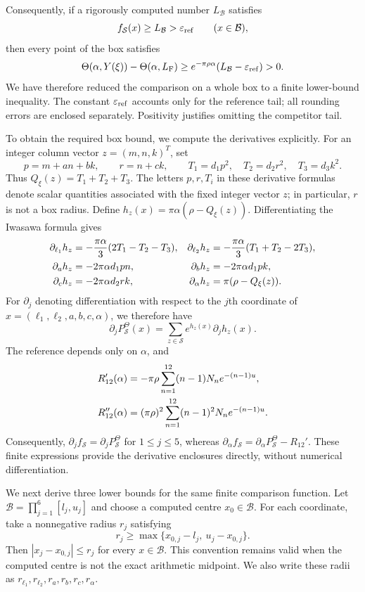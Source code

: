 \documentclass[reqno,english]{amsart}
\theoremstyle{definition}
\newtheorem{open problem}[theorem]{Open Problem}
\theoremstyle{remark}
\theoremstyle{plain}
\numberwithin{equation}{section}
\newcommand{\FCC}{L_{\mathrm F}}
\newcommand{\Th}{\Theta}
\newcommand{\epsref}{\varepsilon_{\rm ref}}
\begin{document}
Consequently, if a rigorously computed number $L_{\mathcal B}$ satisfies
\[
 f_{\mathcal S}(x)\ge L_{\mathcal B}>\epsref
 \qquad(x\in\mathcal B),
\]
then every point of the box satisfies
\[
 \Th(\alpha,Y(\xi))-\Th(\alpha,\FCC)
 \ge e^{-\pi\rho\alpha}(L_{\mathcal B}-\epsref)>0.
\]
We have therefore reduced the comparison on a whole box to a finite
lower-bound inequality. The constant $\epsref$ accounts only for
the reference tail; all rounding errors are enclosed separately.
Positivity justifies omitting the competitor tail.

To obtain the required box bound, we compute the derivatives
explicitly. For an integer column vector $z=(m,n,k)^T$, set
\begin{equation}\label{T:eq:pqt}
 p=m+an+bk,\qquad r=n+ck,\qquad
 T_1=d_1p^2,\quad T_2=d_2r^2,\quad T_3=d_3k^2.
\end{equation}
Thus $Q_\xi(z)=T_1+T_2+T_3$. The letters $p,r,T_i$ in these derivative formulas denote scalar quantities
associated with the fixed integer
vector $z$; in particular, $r$ is not a box radius. Define
$h_z(x)=\pi\alpha(\rho-Q_\xi(z))$. Differentiating the Iwasawa
formula gives
\begin{align}\label{T:eq:hgrad}
 \partial_{\ell_1}h_z
   &=-\frac{\pi\alpha}{3}(2T_1-T_2-T_3),&
 \partial_{\ell_2}h_z
   &=-\frac{\pi\alpha}{3}(T_1+T_2-2T_3),\notag\\
 \partial_a h_z&=-2\pi\alpha d_1pn,&
 \partial_b h_z&=-2\pi\alpha d_1pk,\\
 \partial_c h_z&=-2\pi\alpha d_2rk,&
 \partial_\alpha h_z&=\pi(\rho-Q_\xi(z)).\notag
\end{align}
For $\partial_j$ denoting differentiation with respect to the $j$th
coordinate of $x=(\ell_1,\ell_2,a,b,c,\alpha)$, we therefore have
\[
 \partial_j P^{\Theta}_{\mathcal S}(x)
 =\sum_{z\in\mathcal S}e^{h_z(x)}\partial_jh_z(x).
\]
The reference depends only on $\alpha$, and
\begin{align}\label{T:eq:refderivatives}
 R_{12}'(\alpha)
   &=-\pi\rho\sum_{n=1}^{12}(n-1)N_n e^{-(n-1)u},\notag\\
 R_{12}''(\alpha)
   &=(\pi\rho)^2\sum_{n=1}^{12}(n-1)^2N_n e^{-(n-1)u}.
\end{align}
Consequently,
$\partial_jf_{\mathcal S}=\partial_jP^{\Theta}_{\mathcal S}$
for $1\le j\le5$, whereas
$\partial_\alpha f_{\mathcal S}
=\partial_\alpha P^{\Theta}_{\mathcal S}-R_{12}'$.
These finite expressions provide the derivative enclosures directly,
without numerical differentiation.

We next derive three lower bounds for the same finite comparison
function. Let $\mathcal B=\prod_{j=1}^6[l_j,u_j]$ and choose a
computed centre $x_0\in\mathcal B$. For each coordinate, take a
nonnegative radius $r_j$ satisfying
\[
 r_j\ge\max\{x_{0,j}-l_j,\ u_j-x_{0,j}\}.
\]
Then $|x_j-x_{0,j}|\le r_j$ for every $x\in\mathcal B$. This
convention remains valid when the computed centre is not the exact
arithmetic midpoint. We also write these radii as
$r_{\ell_1},r_{\ell_2},r_a,r_b,r_c,r_\alpha$.
\end{document}
